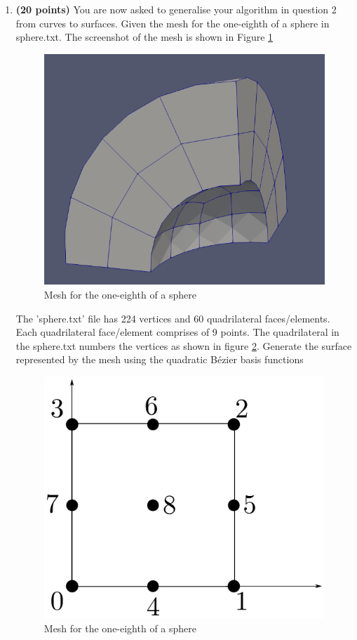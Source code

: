 \documentclass[a4paper, 11pt]{article}
\begin{document}
\begin{enumerate}
\item \textbf{(20 points)} You are now asked to generalise your algorithm in question 2 from curves to surfaces. Given the mesh for the one-eighth of a sphere in sphere.txt. The screenshot of the mesh is shown in Figure \ref{fig:sphereFig}

\begin{figure}
\includegraphics[scale=0.35]{resources/sphere.png} 
\centering
\caption{Mesh for the one-eighth of a sphere}
\label{fig:sphereFig}
\end{figure}

The 'sphere.txt' file has 224 vertices and 60 quadrilateral faces/elements. Each quadrilateral face/element comprises of 9 points. The quadrilateral in the sphere.txt numbers the vertices as shown in figure \ref{fig:sphereNodeNumber}. Generate the surface represented by the mesh  using the quadratic B\'{e}zier basis functions
\begin{figure}
\includegraphics[scale=0.35]{resources/quadraticSquareElement.pdf} 
\centering
\caption{Mesh for the one-eighth of a sphere}
\label{fig:sphereNodeNumber} 
\end{figure}


\end{enumerate}
\end{document}
